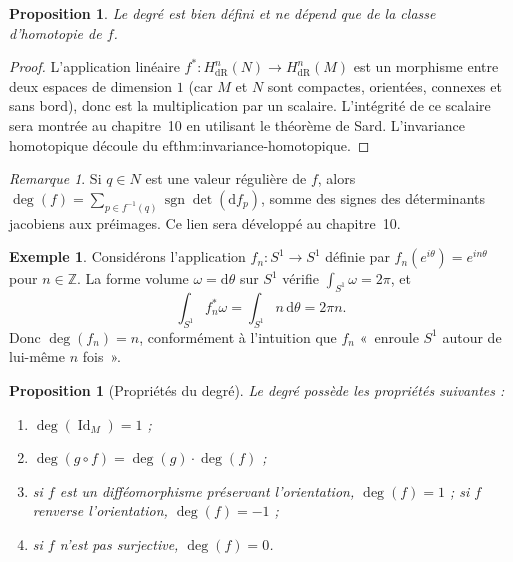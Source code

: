 \documentclass[12pt,a4paper,openany]{book}
\theoremstyle{definition}
\newtheorem{exemple}[definition]{Exemple}
\theoremstyle{plain}
\newtheorem{proposition}[definition]{Proposition}
\theoremstyle{remark}
\newtheorem{remarque}[definition]{Remarque}
\newcommand{\Z}{\mathbb{Z}}
\DeclareMathOperator{\Id}{Id}
\newcommand{\dd}{\mathrm{d}}
\begin{document}
\begin{proposition}\label{prop:degre-bien-defini}
Le degré est bien défini et ne dépend que de la classe d'homotopie de $f$.
\end{proposition}

\begin{proof}
L'application linéaire $f^* \colon H^n_{\mathrm{dR}}(N) \to
H^n_{\mathrm{dR}}(M)$ est un morphisme entre deux espaces de dimension $1$
(car $M$ et $N$ sont compactes, orientées, connexes et sans bord), donc
est la multiplication par un scalaire. L'intégrité de ce scalaire sera
montrée au chapitre~10 en utilisant le théorème de Sard. L'invariance
homotopique découle du 
ef{thm:invariance-homotopique}.
\end{proof}

\begin{remarque}\label{rem:degre-valeur-reguliere}
Si $q \in N$ est une valeur régulière de $f$, alors $\deg(f) = \sum_{p \in
f^{-1}(q)} \operatorname{sgn}\det(\dd f_p)$, somme des signes des
déterminants jacobiens aux préimages. Ce lien sera développé au chapitre~10.
\end{remarque}

\begin{exemple}\label{ex:degre-lacet}
Considérons l'application $f_n \colon S^1 \to S^1$ définie par
$f_n(e^{i\theta}) = e^{in\theta}$ pour $n \in \Z$. La forme volume
$\omega = \dd\theta$ sur $S^1$ vérifie $\int_{S^1} \omega = 2\pi$, et
\[
  \int_{S^1} f_n^*\omega = \int_{S^1} n\,\dd\theta = 2\pi n.
\]
Donc $\deg(f_n) = n$, conformément à l'intuition que $f_n$ «~enroule $S^1$
autour de lui-même $n$ fois~».
\end{exemple}

\begin{proposition}[Propriétés du degré]\label{prop:proprietes-degre}
Le degré possède les propriétés suivantes :
\begin{enumerate}[label=(\roman*)]
  \item $\deg(\Id_M) = 1$ ;
  \item $\deg(g \circ f) = \deg(g) \cdot \deg(f)$ ;
  \item si $f$ est un difféomorphisme préservant l'orientation, $\deg(f) = 1$ ;
  si $f$ renverse l'orientation, $\deg(f) = -1$ ;
  \item si $f$ n'est pas surjective, $\deg(f) = 0$.
\end{enumerate}
\end{proposition}
\end{document}
